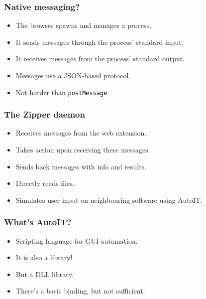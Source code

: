 \begin{frame}
	\frametitle{Native messaging?}


	\begin{itemize}
		\item The browser spawns and manages a process.
		\item It sends messages through the process’ standard input.
		\item It receives messages from the process’ standard output.
		\item Messages use a JSON-based protocol.
		\item Not harder than \texttt{postMessage}.
	\end{itemize}
\end{frame}

\begin{frame}
	\frametitle{The Zipper daemon}

	\begin{itemize}
		\item Receives messages from the web extension.
		\item Takes action upon receiving these messages.
		\item Sends back messages with info and results.
		\item Directly reads files.
		\item Simulates user input on neighbouring software using AutoIT.
	\end{itemize}
\end{frame}

\begin{frame}
	\frametitle{What’s AutoIT?}

	\begin{itemize}
		\item Scripting language for GUI automation.
		\item It is also a library!
		\item But a DLL library.
		\item There’s a basic binding, but not sufficient.
	\end{itemize}
\end{frame}


